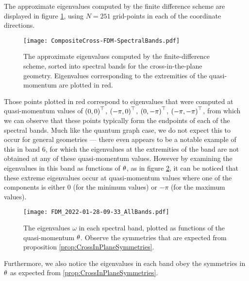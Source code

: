 The approximate eigenvalues computed by the finite difference scheme are displayed in figure \ref{fig:CompositeCross-FDM-SpectralBands}, using $N=251$ grid-points in each of the coordinate directions.
\begin{figure}[b!]
	\centering
	\texttt{[image: CompositeCross-FDM-SpectralBands.pdf]}
	\caption{\label{fig:CompositeCross-FDM-SpectralBands} The approximate eigenvalues computed by the finite-difference scheme, sorted into spectral bands for the cross-in-the-plane geometry. Eigenvalues corresponding to the extremities of the quasi-momentum are plotted in red.}
\end{figure}
Those points plotted in red correspond to eigenvalues that were computed at quasi-momentum values of $\left( 0,0 \right)^\top$, $\left( -\pi,0 \right)^\top$, $\left( 0,-\pi \right)^\top$, $\left( -\pi,-\pi \right)^\top$, from which we can observe that these points typically form the endpoints of each of the spectral bands.
Much like the quantum graph case, we do not expect this to occur for general geometries --- there even appears to be a notable example of this in band 6, for which the eigenvalues at the extremities of the band are not obtained at any of these quasi-momentum values.
However by examining the eigenvalues in this band as functions of $\theta$, as in figure \ref{fig:FDM_2022-01-28-09-33_AllBands}, it can be noticed that these extreme eigenvalues occur at quasi-momentum values where one of the components is either 0 (for the minimum values) or $-\pi$ (for the maximum values).
\begin{figure}[p]
	\centering
	\texttt{[image: FDM\_2022-01-28-09-33\_AllBands.pdf]}
	\caption{\label{fig:FDM_2022-01-28-09-33_AllBands} The eigenvalues $\omega$ in each spectral band, plotted as functions of the quasi-momentum $\theta$. Observe the symmetries that are expected from proposition \ref{prop:CrossInPlaneSymmetries}.}
\end{figure}
Furthermore, we also notice the eigenvalues in each band obey the symmetries in $\theta$ as expected from \ref{prop:CrossInPlaneSymmetries}.

